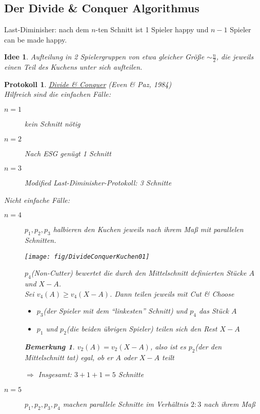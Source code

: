\documentclass[a4paper,10pt]{scrartcl}
\newtheorem*{bemerkung*}{Bemerkung}
\newtheorem*{protokoll*}{Protokoll}
\newtheorem*{idee}{Idee}
\begin{document}
\subsection{Der Divide \& Conquer Algorithmus}
Last-Diminisher: nach dem $n$-ten Schnitt ist 1 Spieler happy und $n-1$ Spieler can be made happy.
\begin{idee}
 Aufteilung in 2 Spielergruppen von etwa gleicher Größe $\sim \frac{n}{2}$, die jeweils einen Teil des Kuchens unter sich aufteilen.
\end{idee}
\begin{protokoll*}
 \underline{Divide \& Conquer} (Even \& Paz, 1984)\\
 Hilfreich sind die einfachen Fälle:
 \begin{description}
  \item[$n=1$] kein Schnitt nötig
  \item[$n=2$] Nach ESG genügt 1 Schnitt
  \item[$n=3$] Modified Last-Diminisher-Protokoll: 3 Schnitte
 \end{description}
 Nicht einfache Fälle:
 \begin{description}
  \item[$n=4$] $p_1,p_2,p_3$ halbieren den Kuchen jeweils nach ihrem Maß mit parallelen Schnitten.
               \begin{center}
                \texttt{[image: fig/DivideConquerKuchen01]}
               \end{center}
               $p_4$(Non-Cutter) bewertet die durch den Mittelschnitt definierten Stücke $A$ und $X-A$.\\
               Sei $v_4(A)\geq v_4(X-A)$. Dann teilen jeweils mit Cut \& Choose
               \begin{itemize}
                \item $p_3$(der Spieler mit dem ``linkesten'' Schnitt) und $p_4$ das Stück $A$
                \item $p_1$ und $p_2$(die beiden übrigen Spieler) teilen sich den Rest $X-A$
               \end{itemize}          
               \begin{bemerkung*}
               $v_2(A)=v_2(X-A)$, also ist es $p_2$(der den Mittelschnitt tat) egal, ob er $A$ oder $X-A$ teilt
               \end{bemerkung*}
               $\Rightarrow$ Insgesamt: $3+1+1=5$ Schnitte
  \item[$n=5$] $p_1,p_2,p_3,p_4$ machen parallele Schnitte im Verhältnis $2:3$ nach ihrem Maß

\end{description}
\end{protokoll*}
\end{document}
